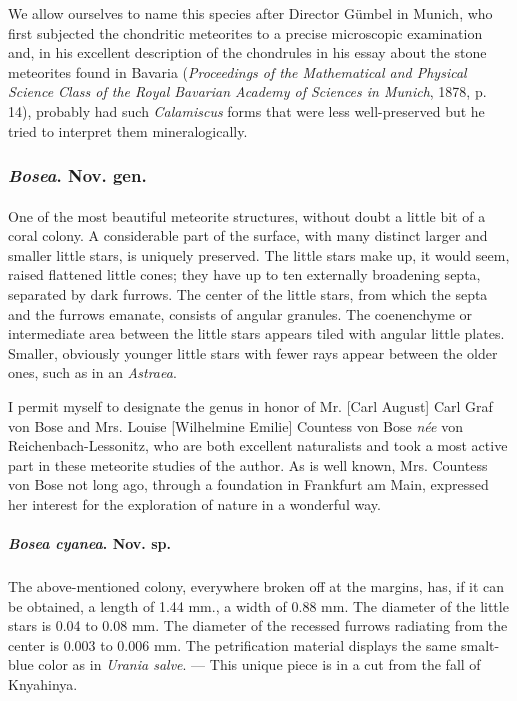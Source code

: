 \documentclass[a4paper, 12pt, oneside]{article}
\begin{document}
We allow ourselves to name this species after Director Gümbel in Munich, who first subjected the chondritic meteorites to a precise microscopic examination and, in his excellent description of the chondrules in his essay about the stone meteorites found in Bavaria (\emph{Proceedings of the Mathematical and Physical Science Class of the Royal Bavarian Academy of Sciences in Munich}, 1878, p. 14), probably had such \emph{Calamiscus} forms that were less well-preserved but he tried to interpret them mineralogically.
\subsubsection{\emph{Bosea}. Nov. gen.}
\paragraph*{}
One of the most beautiful meteorite structures, without doubt a little bit of a coral colony. A considerable part of the surface, with many distinct larger and smaller little stars, is uniquely preserved. The little stars make up, it would seem, raised flattened little cones; they have up to ten externally broadening septa, separated by dark furrows. The center of the little stars, from which the septa and the furrows emanate, consists of angular granules. The coenenchyme or intermediate area between the little stars appears tiled with angular little plates. Smaller, obviously younger little stars with fewer rays appear between the older ones, such as in an \emph{Astraea}.

I permit myself to designate the genus in honor of Mr. [Carl August] Carl Graf von Bose and Mrs. Louise [Wilhelmine Emilie] Countess von Bose \emph{née} von Reichenbach-Lessonitz, who are both excellent naturalists and took a most active part in these meteorite studies of the author. As is well known, Mrs. Countess von Bose not long ago, through a foundation in Frankfurt am Main, expressed her interest for the exploration of nature in a wonderful way.
\paragraph{\emph{Bosea cyanea}. Nov. sp.}
\subparagraph{}
The above-mentioned colony, everywhere broken off at the margins, has, if it can be obtained, a length of 1.44 mm., a width of 0.88 mm. The diameter of the little stars is 0.04 to 0.08 mm. The diameter of the recessed furrows radiating from the center is 0.003 to 0.006 mm. The petrification material displays the same smalt-blue color as in \emph{Urania salve}. --- This unique piece is in a cut from the fall of Knyahinya.
\clearpage
\end{document}

